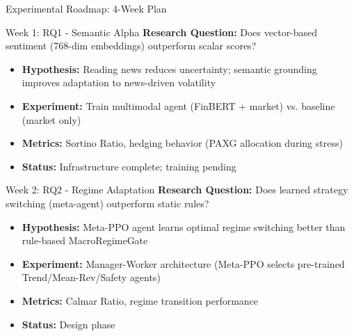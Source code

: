 \documentclass[aspectratio=169]{beamer}
\begin{document}
\begin{frame}{Experimental Roadmap: 4-Week Plan}
\begin{block}{Week 1: RQ1 - Semantic Alpha}
\textbf{Research Question:} Does vector-based sentiment (768-dim embeddings) outperform scalar scores?

\begin{itemize}
    \item \textbf{Hypothesis:} Reading news reduces uncertainty; semantic grounding improves adaptation to news-driven volatility
    \item \textbf{Experiment:} Train multimodal agent (FinBERT + market) vs. baseline (market only)
    \item \textbf{Metrics:} Sortino Ratio, hedging behavior (PAXG allocation during stress)
    \item \textbf{Status:} Infrastructure complete; training pending
\end{itemize}
\end{block}

\vspace{0.3cm}

\begin{block}{Week 2: RQ2 - Regime Adaptation}
\textbf{Research Question:} Does learned strategy switching (meta-agent) outperform static rules?

\begin{itemize}
    \item \textbf{Hypothesis:} Meta-PPO agent learns optimal regime switching better than rule-based MacroRegimeGate
    \item \textbf{Experiment:} Manager-Worker architecture (Meta-PPO selects pre-trained Trend/Mean-Rev/Safety agents)
    \item \textbf{Metrics:} Calmar Ratio, regime transition performance
    \item \textbf{Status:} Design phase
\end{itemize}
\end{block}
\end{frame}
\end{document}
